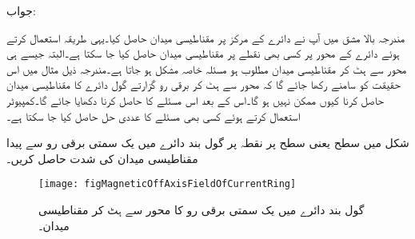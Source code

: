 جواب: 

مندرجہ بالا مشق میں آپ نے دائرے کے مرکز پر مقناطیسی میدان حاصل کیا۔یہی طریقہ استعمال کرتے ہوئے دائرے کے محور پر کسی بھی نقطے پر مقناطیسی میدان حاصل کیا جا سکتا ہے۔البتہ جیسے ہی محور سے ہٹ کر مقناطیسی میدان مطلوب ہو مسئلہ خاصہ مشکل ہو جاتا ہے۔مندرجہ ذیل مثال میں اس حقیقت کو سامنے رکھا جائے گا کہ محور سے ہٹ کر برقی رو گزارتے گول دائرے کا مقناطیسی میدان حاصل کرنا کیوں ممکن نہیں ہو گا۔اس کے بعد  اس مسئلے کا  حاصل کرنا دکھایا جائے گا۔کمپیوٹر استعمال کرتے ہوئے کسی بھی مسئلے کا عددی حل حاصل کیا جا سکتا ہے۔

شکل  میں  سطح یعنی  سطح پر نقطہ  پر گول بند دائرے میں یک سمتی برقی رو سے پیدا مقناطیسی میدان کی شدت حاصل کریں۔ 
\begin{figure}
\centering
\texttt{[image: figMagneticOffAxisFieldOfCurrentRing]}
\caption{گول بند دائرے میں یک سمتی برقی رو کا محور سے ہٹ کر مقناطیسی میدان۔}
\label{شکل_مقناطیسی_دائرہ_محور_سے_ہٹ_کر}
\end{figure}

